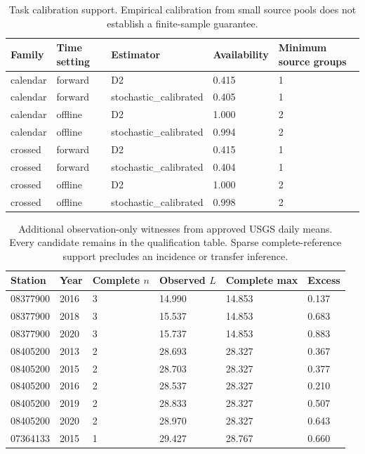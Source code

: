 \begin{table}[p]\centering\small
\caption{Task calibration support. Empirical calibration from small source pools does not establish a finite-sample guarantee.}\label{tab:task-calibration-support}
\begin{tabular}{lllll}
\toprule
Family & Time setting & Estimator & Availability & Minimum source groups\\\midrule
calendar & forward & D2 & 0.415 & 1\\
calendar & forward & stochastic\_calibrated & 0.405 & 1\\
calendar & offline & D2 & 1.000 & 2\\
calendar & offline & stochastic\_calibrated & 0.994 & 2\\
crossed & forward & D2 & 0.415 & 1\\
crossed & forward & stochastic\_calibrated & 0.404 & 1\\
crossed & offline & D2 & 1.000 & 2\\
crossed & offline & stochastic\_calibrated & 0.998 & 2\\
\bottomrule\end{tabular}
\end{table}
\begin{table}[p]\centering\small
\caption{Additional observation-only witnesses from approved USGS daily means. Every candidate remains in the qualification table. Sparse complete-reference support precludes an incidence or transfer inference.}\label{tab:additional-observed-records}
\begin{tabular}{llllll}
\toprule
Station & Year & Complete $n$ & Observed $L$ & Complete max & Excess\\\midrule
08377900 & 2016 & 3 & 14.990 & 14.853 & 0.137\\
08377900 & 2018 & 3 & 15.537 & 14.853 & 0.683\\
08377900 & 2020 & 3 & 15.737 & 14.853 & 0.883\\
08405200 & 2013 & 2 & 28.693 & 28.327 & 0.367\\
08405200 & 2015 & 2 & 28.703 & 28.327 & 0.377\\
08405200 & 2016 & 2 & 28.537 & 28.327 & 0.210\\
08405200 & 2019 & 2 & 28.833 & 28.327 & 0.507\\
08405200 & 2020 & 2 & 28.970 & 28.327 & 0.643\\
07364133 & 2015 & 1 & 29.427 & 28.767 & 0.660\\
\bottomrule\end{tabular}
\end{table}
